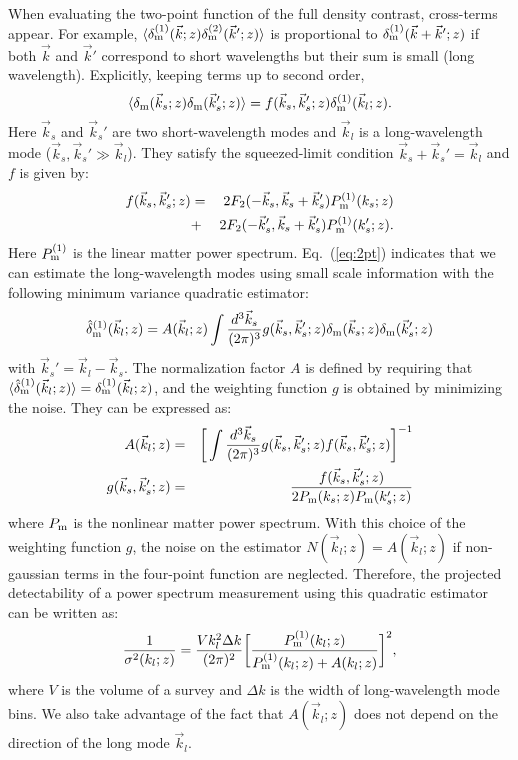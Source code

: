 \documentclass[prd,amsmath,amssymb,floatfix,superscriptaddress,nofootinbib,twocolumn]{revtex4-1}
\def\be{\begin{equation}}
\def\ee{\end{equation}}
\def\bea{\begin{eqnarray}}
\def\eea{\end{eqnarray}}
\newcommand{\vs}{\nonumber\\}
\newcommand{\vk}{\vec{k}}
\newcommand{\ec}[1]{Eq.~(\ref{eq:#1})}
\newcommand{\eql}[1]{\label{eq:#1}}
\begin{document}
When evaluating the two-point function of the full density contrast, cross-terms appear. For example, $\langle \delta_{\rm m}^{(1)}(\vk;z) \delta_{\rm m}^{(2)}(\vk';z) \rangle$ is proportional to $\delta^{(1)}_{\rm m}(\vk+\vk';z)$ if both $\vk$ and $\vk'$ correspond to short wavelengths but their sum is small (long wavelength). Explicitly, keeping terms up to second order, 
\be
\langle {\delta}_{\rm m}(\vec{k}_s;z){\delta}_{\rm m}(\vec{k}_s';z) \rangle =f(\vec{k}_s,\vec{k}_s';z){\delta}^{(1)}_{\rm m}(\vec{k}_l;z). \eql{2pt}
\ee 
Here $\vk_s$ and $\vk_s'$ are two short-wavelength modes and $\vk_l$ is a long-wavelength mode ($\vk_s,\vk_s' \gg \vk_l$). They satisfy the squeezed-limit condition $\vk_s+\vk_s'=\vk_l$ and $f$ is given by:
\bea
f(\vec{k}_s,\vec{k}_s';z)&=&2F_2(-\vec{k}_s,\vec{k}_s+\vec{k}_s')P_{\rm m}^{(1)}(k_s;z)\vs
&+&2F_2(-\vec{k}_s',\vec{k}_s+\vec{k}_s')P_{\rm m}^{(1)}(k_s';z)       .\eql{deff}
\eea 
Here $P_{\rm m}^{(1)}$ is the linear matter power spectrum. \ec{2pt} indicates that we can estimate the long-wavelength modes using small scale information with the following minimum variance quadratic estimator:
\begin{eqnarray}
\hat{\delta}^{(1)}_{\rm m}(\vec{k}_l;z)=A(\vec{k}_l;z)\int \frac{d^3 \vec{k}_s}{(2\pi)^3} g(\vec{k}_s,\vec{k}_s';z){\delta}_{\rm m}(\vec{k}_s;z){\delta}_{\rm m}(\vec{k}_s';z)\vs \eql{quadest}
\end{eqnarray} 
with $\vk_s'=\vk_l-\vk_s$. The normalization factor $A$ is defined by requiring that $\langle \hat{\delta}_{\rm m}^{(1)}(\vec{k}_l;z) \rangle={\delta}_{\rm m}^{(1)}(\vec{k}_l;z)$, and the weighting function $g$ is obtained by minimizing the noise. They can be expressed as:
\begin{eqnarray}
A(\vec{k}_l;z)&=&\bigg[\int \frac{d^3 \vec{k}_s}{(2\pi)^3} g(\vec{k}_s,\vec{k}_s';z)f(\vec{k}_s,\vec{k}_s';z)  \bigg]^{-1} \eql{a} \vs
g(\vec{k}_{s},\vec{k}_{s}';z)&=&\frac{f(\vec{k}_{s},\vec{k}_{s}';z)}{2P_{\rm m}(k_{s};z)P_{\rm m}(k_{s}';z)}
\end{eqnarray}
where $P_{\rm m}$ is the nonlinear matter power spectrum. With this choice of the weighting function $g$, the noise on the estimator $N(\vk_l;z)=A(\vk_l;z)$ if non-gaussian terms in the four-point function are neglected. Therefore, the projected detectability of a power spectrum measurement using this quadratic estimator can be written as:
\be
\frac{1}{\sigma^{2}(k_l;z)}=\frac{V k_l^2 \Delta k }{(2\pi)^2}\bigg[\frac{P_{\rm m}^{(1)}(k_l;z)}{P_{\rm m}^{(1)}(k_l;z)+A(k_l;z) }\bigg]^2 \eql{error},
\ee
where $V$ is the volume of a survey and $\Delta k$ is the width of long-wavelength mode bins. We also take advantage of the fact that $A(\vk_l;z)$ does not depend on the direction of the long mode $\vk_l$.
\end{document}
